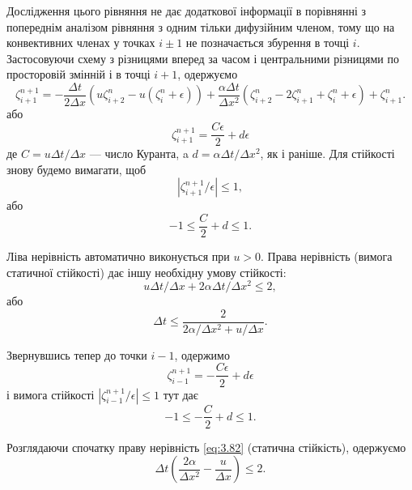 Дослідження цього рівняння не дає додаткової інформації в порівнянні з попереднім аналізом рівняння з одним тільки дифузійним членом, тому що на конвективних членах у точках $i \pm 1$ не позначається збурення в точці $i$. Застосовуючи схему з різницями вперед за часом і центральними різницями по просторовій змінній і в точці $i + 1$, одержуємо
\begin{equation}
    \label{eq:3.76}
    \zeta_{i + 1}^{n + 1} = - \frac{\Delta t}{2 \Delta x} ( u \zeta_{i + 2}^n - u(\zeta_i^n + \epsilon)) + \frac{\alpha \Delta t}{\Delta x^2} (\zeta_{i + 2}^n - 2 \zeta_{i + 1}^n + \zeta_i^n + \epsilon) + \zeta_{i + 1}^n.
\end{equation}
або
\begin{equation}
    \label{eq:3.77}
    \zeta_{i + 1}^{n + 1} = \frac{C \epsilon}{2} + d \epsilon
\end{equation}
де $C = u \Delta t / \Delta x$ --- число Куранта, a $d = \alpha \Delta t / \Delta x^2$, як і раніше. Для стійкості знову будемо вимагати, щоб
\begin{equation}
    \label{eq:3.78}
    |\zeta_{i + 1}^{n + 1} / \epsilon| \le 1,
\end{equation}
або
\begin{equation}
    \label{eq:3.79}
    -1 \le \frac{C}{2} + d \le 1.
\end{equation}

Ліва нерівність автоматично виконується при $u > 0$. Права нерівність (вимога статичної стійкості) дає іншу необхідну умову стійкості:
\begin{equation}
    u \Delta t / \Delta x + 2 \alpha \Delta t / \Delta x^2 \le 2,
\end{equation}
або
\begin{equation}
    \label{eq:3.80}
    \Delta t \le \frac{2}{2 \alpha / \Delta x^2 + u / \Delta x}.    
\end{equation}

Звернувшись тепер до точки $i - 1$, одержимо
\begin{equation}
    \label{eq:3.81}
    \zeta_{i - 1}^{n + 1} = - \frac{C \epsilon}{2} + d \epsilon
\end{equation}
і вимога стійкості $|\zeta_{i - 1}^{n + 1} / \epsilon| \le 1$ тут дає
\begin{equation}
    \label{eq:3.82}
    -1 \le - \frac{C}{2} + d \le 1.
\end{equation}

Розглядаючи спочатку праву нерівність \eqref{eq:3.82} (статична стійкість), одержуємо
\begin{equation}
    \label{eq:3.83}
    \Delta t \left( \frac{2 \alpha}{\Delta x^2} - \frac{u}{\Delta x} \right) \le 2.    
\end{equation}

